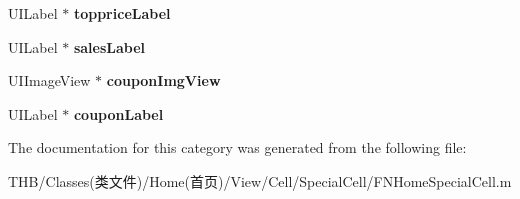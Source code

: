 \begin{DoxyCompactItemize}
U\+I\+Label $\ast$ {\bfseries topprice\+Label}
\item 
\mbox{\label{category_f_n_home_special_cell_07_08_a98997f4503fdd4bc20556a8186100936}} 
U\+I\+Label $\ast$ {\bfseries sales\+Label}
\item 
\mbox{\label{category_f_n_home_special_cell_07_08_a7bb4aa63305a4545979d769edfb00b99}} 
U\+I\+Image\+View $\ast$ {\bfseries coupon\+Img\+View}
\item 
\mbox{\label{category_f_n_home_special_cell_07_08_ac7c2c13e7eda17ba3b186eaaae5c698f}} 
U\+I\+Label $\ast$ {\bfseries coupon\+Label}
\end{DoxyCompactItemize}


The documentation for this category was generated from the following file\+:\begin{DoxyCompactItemize}
\item 
T\+H\+B/\+Classes(类文件)/\+Home(首页)/\+View/\+Cell/\+Special\+Cell/F\+N\+Home\+Special\+Cell.\+m\end{DoxyCompactItemize}

